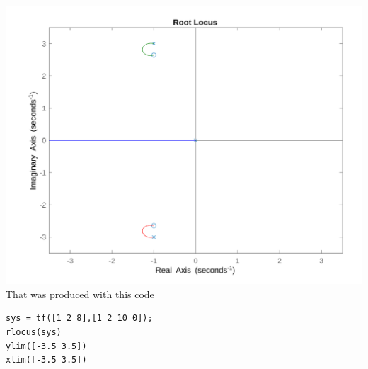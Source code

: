 \documentclass[12pt]{article}
\begin{document}
\includegraphics[scale=.15]{Problem1Matlab1.png}
\\That was produced with this code
\begin{verbatim}
sys = tf([1 2 8],[1 2 10 0]);
rlocus(sys)
ylim([-3.5 3.5])
xlim([-3.5 3.5])
\end{verbatim}
\end{document}
